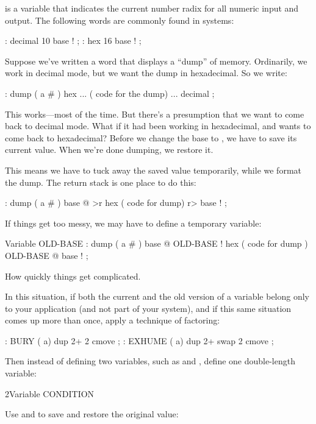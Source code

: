 %
 is a variable that indicates the current
number radix for all numeric input and output. The following words are
commonly found in \Forth{} systems:

\begin{Code}
: decimal   10 base ! ;
: hex   16 base ! ;
\end{Code}
Suppose we've written a word that displays a ``dump'' of memory.
Ordinarily, we work in decimal mode, but we want the dump in hexadecimal.
So we write:

\begin{Code}
: dump  ( a # )
   hex   ...   ( code for the dump) ... decimal ;
\end{Code}
This works---most of the time. But there's a presumption that we want to
come back to decimal mode. What if it had been working in hexadecimal, and
wants to come back to hexadecimal? Before we change the base to
, we have to save its current value. When we're done dumping,
we restore it.

This means we have to tuck away the saved value temporarily,
while we format the dump. The return stack is one place to do this:

\begin{Code}
: dump  ( a # )
   base @ >r  hex   ( code for dump)  r> base ! ;
\end{Code}
If things get too messy, we may have to define a temporary variable:

\begin{Code}
Variable OLD-BASE
: dump  ( a # )
   base @  OLD-BASE !  hex ( code for dump )
   OLD-BASE @  base ! ;
\end{Code}
How quickly things get complicated.%

In this situation, if both the current and the old version of a variable
belong only to your application (and not part of your system), and if this
same situation comes up more than once, apply a technique of factoring:

\begin{Code}
: BURY  ( a)  dup 2+  2 cmove ;
: EXHUME  ( a)  dup 2+  swap 2 cmove ;
\end{Code}
Then instead of defining two variables, such as  and
, define one double-length variable:

\begin{Code}
2Variable CONDITION
\end{Code}
Use  and  to save and restore the original value:


